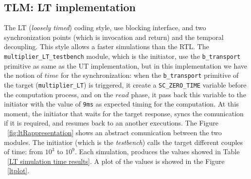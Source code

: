 \documentclass[]{IEEEtran}
\begin{document}
		
		
		
	\subsection{TLM: LT implementation}
	\label{sec:lt}
	The LT (\textit{loosely timed}) coding style, use blocking interface, and two synchronization points (which is invocation and return) and the temporal decoupling. This style allows a faster simulations than the RTL. The \verb|multiplier_LT_testbench| module, which is the initiator, use the \verb|b_transport| primitive as same as the UT implementation, but in this implementation we have the notion of $time$ for the synchronization: when the \verb|b_transport| primitive of the target (\verb|multiplier_LT|) is triggered, it create a \verb|SC_ZERO_TIME|  variable before the computation process, and on the $read$ phase, it pass back this variable to the initiator with the value of \verb|9ms| as expected timing for the computation. At this moment,  the initiator that waits for the target response, syncs the comunication if it is required, and resumes back to an another executions. The Figure ~\ref{fig:ltRappresentation} shows an abstract comunication between the two modules.
	The initiatior (which is the \textit{testbench}) calls the target different couples of time: from $10^3$ to $10^9$.
		Each simulation, produces the values showed in Table ~\ref{LT simulation time results}. A plot of the values is showed in the Figure ~\ref{ltplot}.
	
	
 	
\end{document}
